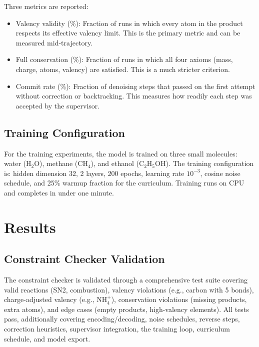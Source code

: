 \documentclass[11pt]{article}
\begin{document}
Three metrics are reported:

\begin{itemize}[nosep]
  \item Valency validity (\%): Fraction of runs in which every atom in
        the product respects its effective valency limit. This is the
        primary metric and can be measured mid-trajectory.
  \item Full conservation (\%): Fraction of runs in which all four
        axioms (mass, charge, atoms, valency) are satisfied. This is a
        much stricter criterion.
  \item Commit rate (\%): Fraction of denoising steps that passed on the
        first attempt without correction or backtracking. This measures
        how readily each step was accepted by the supervisor.
\end{itemize}

\subsection{Training Configuration}

For the training experiments, the model is trained on three small
molecules: water (H$_2$O), methane (CH$_4$), and ethanol (C$_2$H$_5$OH).
The training configuration is: hidden dimension 32, 2 layers, 200
epochs, learning rate $10^{-3}$, cosine noise schedule, and 25\% warmup
fraction for the curriculum. Training runs on CPU and completes in under
one minute.

\section{Results}

\subsection{Constraint Checker Validation}

The constraint checker is validated through a comprehensive test suite
covering valid reactions (SN2, combustion), valency violations (e.g.,
carbon with 5 bonds), charge-adjusted valency (e.g., NH$_4^+$),
conservation violations (missing products, extra atoms), and edge cases
(empty products, high-valency elements). All tests pass, additionally
covering encoding/decoding, noise schedules, reverse steps, correction
heuristics, supervisor integration, the training loop, curriculum
schedule, and model export.
\end{document}
